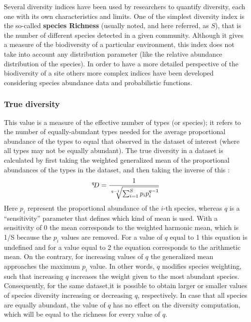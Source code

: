Several diversity indices have been used by researchers to quantify diversity, each one with its own characteristics and limits. One of the simplest diversity index is the so-called \textbf{species Richness} (usually noted, and here referred, as $S$), that is the number of different species detected in a given community. Although it gives a measure of the biodiversity of a particular environment, this index does not take into account any distribution parameter (like the relative abundance distribution of the species). In order to have a more detailed perspective of the biodiversity of a site others more complex indices have been developed considering species abundance data and probabilistic functions.
\subsubsection*{True diversity}
\label{sec:tdiversity}
This value is a measure of the effective number of types (or species); it refers to the number of equally-abundant types needed for the average proportional abundance of the types to equal that observed in the dataset of interest (where all types may not be equally abundant). The true diversity in a dataset is calculated by first taking the weighted generalized mean of the proportional abundances of the types in the dataset, and then taking the inverse of this \cite{tuomisto2010diversity}:
\begin{equation*}
{}^q\!D={1 \over \sqrt[q-1]{{\sum_{i=1}^S p_i p_i^{q-1}}}}
\end{equation*}
Here $p_i$ represent the proportional abundance of the $i$-th species, whereas $q$ is a ``sensitivity'' parameter that defines which kind of mean is used. With a sensitivity of 0 the mean corresponds to the weighted harmonic mean, which is 1/S because the $p_i$ values are removed. For a value of $q$ equal to 1 this equation is undefined and for a value equal to 2 the equation corresponds to the arithmetic mean. On the contrary, for increasing values of $q$ the generalized mean approaches the maximum $p_i$ value. In other words, $q$ modifies species weighting, such that increasing $q$ increases the weight given to the most abundant species. Consequently, for the same dataset,it is possible to obtain larger or smaller values of species diversity increasing or decreasing $q$, respectively. In case that all species are equally abundant, the value of $q$ has no effect on the diversity computation, which will be equal to the richness for every value of $q$.\\
